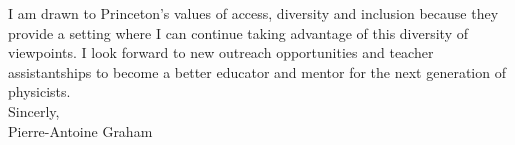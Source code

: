 \documentclass[12pt]{article}
\begin{document}
I am drawn to Princeton's values of access, diversity and inclusion because they provide a setting where I can continue taking advantage of this diversity of viewpoints. I look forward to new outreach opportunities and teacher assistantships to become a better educator and mentor for the next generation of physicists.\\


Sincerly, \\

Pierre-Antoine Graham
\end{document}
